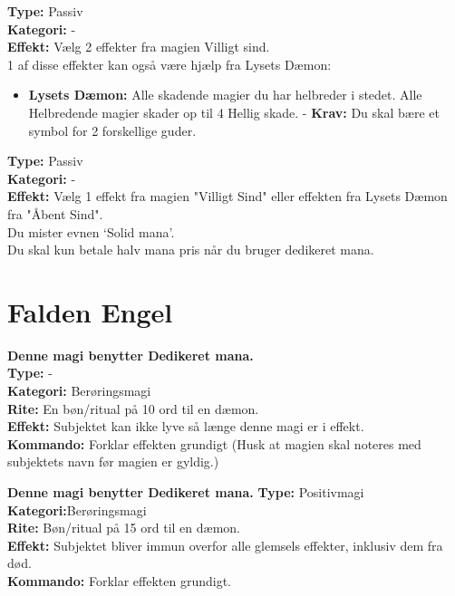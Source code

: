 \begin{korruption*}
\textbf{Type:} Passiv\\
\textbf{Kategori:} -\\
\textbf{Effekt:} Vælg 2 effekter fra magien Villigt sind.\\
1 af disse effekter kan også være hjælp fra Lysets Dæmon:
\begin{itemize}
    \item \textbf{Lysets Dæmon:} Alle skadende magier du har helbreder i stedet. Alle Helbredende magier skader op til 4 Hellig skade. - \textbf{Krav:} Du skal bære et symbol for 2 forskellige guder.
\end{itemize}
\end{korruption*}

\begin{korruption*}
\textbf{Type:} Passiv\\
\textbf{Kategori:} -\\
\textbf{Effekt:} Vælg 1 effekt fra magien "Villigt Sind" eller effekten fra Lysets Dæmon fra "Åbent Sind".\\
Du mister evnen ‘Solid mana’.\\ 
Du skal kun betale halv mana pris når du bruger dedikeret mana.
\end{korruption*}

\section{Falden Engel}

\begin{falden*}
\textbf{Denne magi benytter Dedikeret mana.}\\
\textbf{Type:} - \\
\textbf{Kategori:} Berøringsmagi\\
\textbf{Rite:} En bøn/ritual på 10 ord til en dæmon.\\
\textbf{Effekt:} Subjektet kan ikke lyve så længe denne magi er i effekt.\\
\textbf{Kommando:} Forklar effekten grundigt (Husk at magien skal noteres med subjektets navn før magien er gyldig.)
\end{falden*}

\begin{falden*}
\textbf{Denne magi benytter Dedikeret mana.}
\textbf{Type:} Positivmagi\\
\textbf{Kategori:}Berøringsmagi\\
\textbf{Rite:} Bøn/ritual på 15 ord til en dæmon.\\
\textbf{Effekt:} Subjektet bliver immun overfor alle glemsels effekter, inklusiv dem fra død.\\
\textbf{Kommando:} Forklar effekten grundigt.
\end{falden*}

